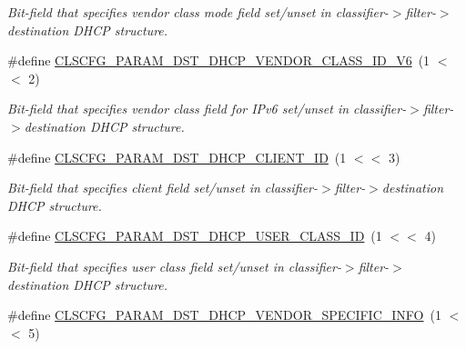 \begin{DoxyCompactItemize}
\begin{DoxyCompactList}\small\item\em Bit-\/field that specifies vendor class mode field set/unset in classifier-\/$>$filter-\/$>$destination D\-H\-C\-P structure. \end{DoxyCompactList}\item 
\hypertarget{group__FAPI__QOS__CLASS_ga98fc67134bf609f750fe5d8dc3bfb211}{\#define \hyperlink{group__FAPI__QOS__CLASS_ga98fc67134bf609f750fe5d8dc3bfb211}{C\-L\-S\-C\-F\-G\-\_\-\-P\-A\-R\-A\-M\-\_\-\-D\-S\-T\-\_\-\-D\-H\-C\-P\-\_\-\-V\-E\-N\-D\-O\-R\-\_\-\-C\-L\-A\-S\-S\-\_\-\-I\-D\-\_\-\-V6}~(1 $<$$<$ 2)}\label{group__FAPI__QOS__CLASS_ga98fc67134bf609f750fe5d8dc3bfb211}

\begin{DoxyCompactList}\small\item\em Bit-\/field that specifies vendor class field for I\-Pv6 set/unset in classifier-\/$>$filter-\/$>$destination D\-H\-C\-P structure. \end{DoxyCompactList}\item 
\hypertarget{group__FAPI__QOS__CLASS_gab53254a13641816f7df02e24bb5c2190}{\#define \hyperlink{group__FAPI__QOS__CLASS_gab53254a13641816f7df02e24bb5c2190}{C\-L\-S\-C\-F\-G\-\_\-\-P\-A\-R\-A\-M\-\_\-\-D\-S\-T\-\_\-\-D\-H\-C\-P\-\_\-\-C\-L\-I\-E\-N\-T\-\_\-\-I\-D}~(1 $<$$<$ 3)}\label{group__FAPI__QOS__CLASS_gab53254a13641816f7df02e24bb5c2190}

\begin{DoxyCompactList}\small\item\em Bit-\/field that specifies client field set/unset in classifier-\/$>$filter-\/$>$destination D\-H\-C\-P structure. \end{DoxyCompactList}\item 
\hypertarget{group__FAPI__QOS__CLASS_gab9727303c2c9296c4974bd50a1cf8021}{\#define \hyperlink{group__FAPI__QOS__CLASS_gab9727303c2c9296c4974bd50a1cf8021}{C\-L\-S\-C\-F\-G\-\_\-\-P\-A\-R\-A\-M\-\_\-\-D\-S\-T\-\_\-\-D\-H\-C\-P\-\_\-\-U\-S\-E\-R\-\_\-\-C\-L\-A\-S\-S\-\_\-\-I\-D}~(1 $<$$<$ 4)}\label{group__FAPI__QOS__CLASS_gab9727303c2c9296c4974bd50a1cf8021}

\begin{DoxyCompactList}\small\item\em Bit-\/field that specifies user class field set/unset in classifier-\/$>$filter-\/$>$destination D\-H\-C\-P structure. \end{DoxyCompactList}\item 
\hypertarget{group__FAPI__QOS__CLASS_gaf5982f892057e0893c6c3b414f4e26c8}{\#define \hyperlink{group__FAPI__QOS__CLASS_gaf5982f892057e0893c6c3b414f4e26c8}{C\-L\-S\-C\-F\-G\-\_\-\-P\-A\-R\-A\-M\-\_\-\-D\-S\-T\-\_\-\-D\-H\-C\-P\-\_\-\-V\-E\-N\-D\-O\-R\-\_\-\-S\-P\-E\-C\-I\-F\-I\-C\-\_\-\-I\-N\-F\-O}~(1 $<$$<$ 5)}\label{group__FAPI__QOS__CLASS_gaf5982f892057e0893c6c3b414f4e26c8}


\end{DoxyCompactItemize}
